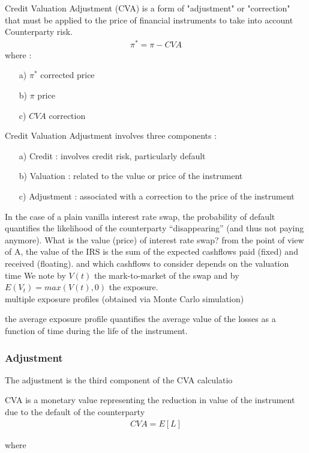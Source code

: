 \documentclass[11pt]{article}
\numberwithin{equation}{subsection}
\begin{document}
Credit Valuation Adjustment (CVA) is a form of "adjustment" or "correction" that must be applied to the price of financial instruments to take into account Counterparty risk.
\begin{eqnarray}
	\pi^{*}=\pi - CVA
\end{eqnarray}
where :
\begin{enumerate}
	\item [a)] \(\pi^{*}\) corrected price
	\item [b)] \(\pi\) price
	\item [c)] \(CVA\) correction
\end{enumerate}
Credit Valuation Adjustment involves three components :
\begin{enumerate}
	\item [a)] Credit : involves credit risk, particularly default
	\item [b)] Valuation : related to the value or price of the instrument
	\item [c)] Adjustment : associated with a correction to the price of the instrument
\end{enumerate}
In the case of a plain vanilla interest rate swap, the probability of default quantifies the likelihood of the counterparty “disappearing” (and thus not paying anymore).
What is the value (price) of interest rate swap?
from the point of view of A, the value of the IRS is the sum of the expected cashflows paid (fixed) and received
(floating). and which cashflows to consider depends on the valuation time
We note by \(V(t)\) the mark-to-market of the swap and by \(E(V_t) = max(V(t), 0)\) the exposure.\\

multiple exposure profiles (obtained via Monte Carlo simulation)


the average exposure profile quantifies the average value of the losses as a function of time during the life of the instrument.

\subsubsection{Adjustment}
The adjustment is the third component of the CVA calculatio 

CVA is a monetary value representing the reduction in value of the instrument due to the default of the counterparty
\begin{eqnarray}
CVA = E[L]
\end{eqnarray}

where 
\end{document}
